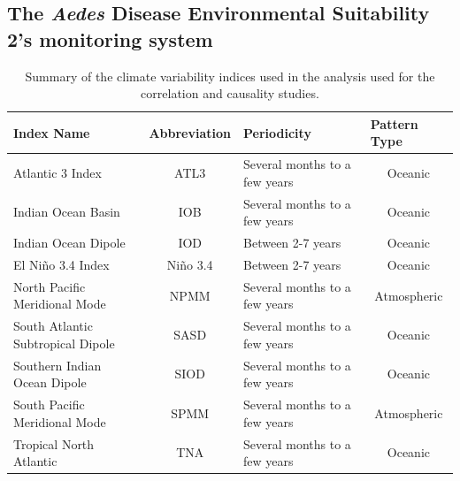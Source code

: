 \documentclass[10pt,twocolumn]{wlscirep}
\begin{document}
\subsection{The \textit{Aedes} Disease Environmental Suitability 2's monitoring system} \label{sec-methods-aedes2}

\begin{table}[t]
  \centering
  \begin{tabular}{l|c|l|c}
    \textbf{Index Name}               & \multicolumn{1}{l|}{\textbf{Abbreviation}} & \textbf{Periodicity}          & \multicolumn{1}{l|}{\textbf{Pattern Type}} \\ \hline
    Atlantic 3 Index                  & ATL3                                       & Several months to a few years & Oceanic                                    \\
    Indian Ocean Basin                & IOB                                        & Several months to a few years & Oceanic                                    \\
    Indian Ocean Dipole               & IOD                                        & Between 2-7 years             & Oceanic                                    \\
    El Niño 3.4 Index                 & Niño 3.4                                   & Between 2-7 years             & Oceanic                                    \\
    North Pacific Meridional Mode     & NPMM                                       & Several months to a few years & Atmospheric                                \\
    South Atlantic Subtropical Dipole & SASD                                       & Several months to a few years & Oceanic                                    \\
    Southern Indian Ocean Dipole      & SIOD                                       & Several months to a few years & Oceanic                                    \\
    South Pacific Meridional Mode     & SPMM                                       & Several months to a few years & Atmospheric                                \\
    Tropical North Atlantic           & TNA                                        & Several months to a few years & Oceanic
  \end{tabular}%
  \caption{Summary of the climate variability indices used in the analysis used for the correlation and causality studies.}
  \label{tab:climate-variability-indices}
\end{table}
\end{document}
